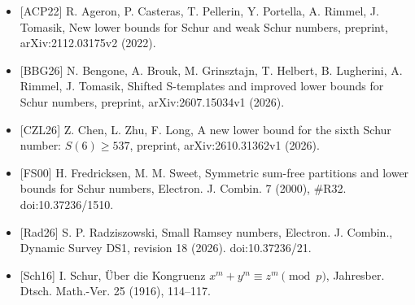\documentclass[
]{article}
\providecommand{\tightlist}{%
  \setlength{\itemsep}{0pt}\setlength{\parskip}{0pt}}
\begin{document}
\begin{itemize}
\tightlist
\item
  {[}ACP22{]} R. Ageron, P. Casteras, T. Pellerin, Y. Portella, A.
  Rimmel, J. Tomasik, New lower bounds for Schur and weak Schur numbers,
  preprint, arXiv:2112.03175v2 (2022).
\item
  {[}BBG26{]} N. Bengone, A. Brouk, M. Grinsztajn, T. Helbert, B.
  Lugherini, A. Rimmel, J. Tomasik, Shifted S-templates and improved
  lower bounds for Schur numbers, preprint, arXiv:2607.15034v1 (2026).
\item
  {[}CZL26{]} Z. Chen, L. Zhu, F. Long, A new lower bound for the sixth
  Schur number: \(S(6)\ge 537\), preprint, arXiv:2610.31362v1 (2026).
\item
  {[}FS00{]} H. Fredricksen, M. M. Sweet, Symmetric sum-free partitions
  and lower bounds for Schur numbers, Electron. J. Combin. 7 (2000),
  \#R32. doi:10.37236/1510.
\item
  {[}Rad26{]} S. P. Radziszowski, Small Ramsey numbers, Electron. J.
  Combin., Dynamic Survey DS1, revision 18 (2026). doi:10.37236/21.
\item
  {[}Sch16{]} I. Schur, Über die Kongruenz
  \(x^m+y^m\equiv z^m \pmod p\), Jahresber. Dtsch. Math.-Ver. 25 (1916),
  114--117.
\end{itemize}
\end{document}
